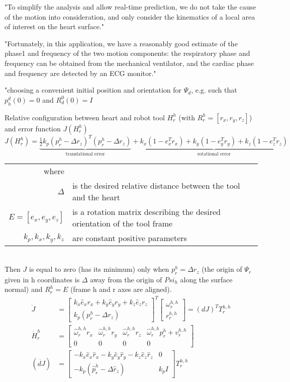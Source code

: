 "To simplify the analysis and allow real-time prediction, we do not take the cause of the motion into consideration, and only consider the kinematics of a local area of interest on the heart surface."

"Fortunately, in this application, we have a reasonably good estimate of the phase1 and frequency of the two motion components: the respiratory phase and frequency can be obtained from the mechanical ventilator, and the cardiac phase and frequency are detected by an ECG monitor."

"choosing a convenient initial position and orientation for $\Psi_d$, e.g. such that $p^d_h(0)=0$ and $R^0_d(0) = I$

Relative configuration between heart and robot tool $H^h_r$ (with $R^h_r =[r_x, r_y, r_z]$) and error function $J(H^h_r)$
\begin{equation}
J(H^h_r) = \underbrace{\tfrac{1}{2}k_p (p^h_r-\Delta r_z)^T(p^h_r-\Delta r_z)}_\text{translational error} + \underbrace{k_x (1-e_x^T r_x) + k_y (1-e_y^T r_y) + k_z (1-e_z^T r_z)}_\text{rotational error}
\end{equation}
\begin{tabular}{rl}
	where &\\
	$\Delta$ & is the desired relative distance between the tool and the heart\\
	$E=[e_x,e_y,e_z]$ & is a rotation matrix describing the desired orientation of the tool frame\\
	$k_p,k_x,k_y,k_z$ & are constant positive parameters\\
\end{tabular}\\

Then $J$ is equal to zero (has its minimum) only when $p^h_r=\Delta r_z$ (the origin of $\Psi_r$ given in h coordinates is $\Delta$ away from the origin of $Psi_h$ along the surface normal) and $R^h_r=E$ (frame h and r axes are aligned).
\begin{align}
\dot{J} &= 
\begin{bmatrix}
k_x \hat{e}_x r_x + k_y \hat{e}_y r_y + k_z \hat{e}_z r_z\\
k_p(p^h_r - \Delta r_z)
\end{bmatrix}^T
\begin{bmatrix}
\omega^{h,h}_r \\
r^{h,h}_r
\end{bmatrix}
= (dJ)^T T^{h,h}_r\\
\dot{H}^h_r &= 
\begin{bmatrix}
\hat{\omega}^{h,h}_r r_x & \hat{\omega}^{h,h}_r r_y & \hat{\omega}^{h,h}_r r_z & \hat{\omega}^{h,h}_r p^h_r + v^{h,h}_r\\
0 & 0 & 0 & 0
\end{bmatrix}\\
(\dot{dJ}) &=
\begin{bmatrix}
-k_x \hat{e}_x \hat{r}_x  - k_y \hat{e}_y \hat{r}_y - k_z \hat{e}_z \hat{r}_z & 0\\
-k_p(\hat{p}^h_r - \Delta \hat{r}_z) & k_p I
\end{bmatrix}
T^{h,h}_r
\end{align}

